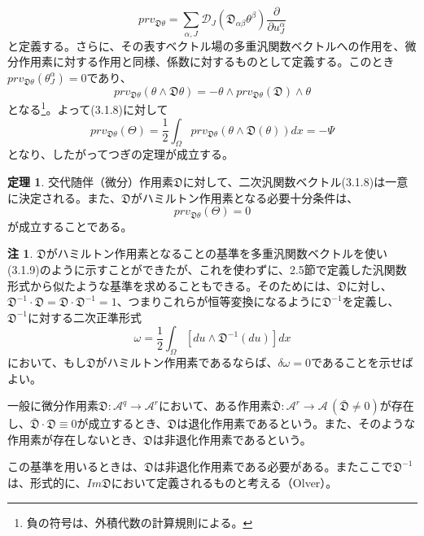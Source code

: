 \documentclass[a4paper, 11pt]{report}
\theoremstyle{definition}
\newtheorem{theorem}{定理}[section]
\newtheorem*{remark*}{注}
\begin{document}
\begin{equation*}
prv_{\mathfrak{D}\theta} = \sum_{\alpha ,J}\mathcal{D}_J(\mathfrak{D}_{\alpha\beta}\theta^\beta )\frac{\partial}{\partial u_J^\alpha }
\end{equation*}
と定義する。さらに、その表すベクトル場の多重汎関数ベクトルへの作用を、微分作用素に対する作用と同様、係数に対するものとして定義する。このとき$prv_{\mathfrak{D}\theta}(\theta_J^\alpha )=0$であり、
\begin{equation*}
prv_{\mathfrak{D}\theta}(\theta\wedge\mathfrak{D}\theta ) = -\theta\wedge prv_{\mathfrak{D}\theta}(\mathfrak{D})\wedge\theta
\end{equation*}
となる\footnote{負の符号は、外積代数の計算規則による。}。よって(3.1.8)に対して
\begin{equation*}
prv_{\mathfrak{D}\theta}(\Theta ) = \frac{1}{2}\int_\Omega prv_{\mathfrak{D}\theta}(\theta\wedge\mathfrak{D}(\theta ))dx = -\Psi
\end{equation*}
となり、したがってつぎの定理が成立する。

\begin{theorem}
 交代随伴（微分）作用素$\mathfrak{D}$に対して、二次汎関数ベクトル(3.1.8)は一意に決定される。また、$\mathfrak{D}$がハミルトン作用素となる必要十分条件は、
\begin{equation}
prv_{\mathfrak{D}\theta}(\Theta ) = 0  %
\end{equation}
が成立することである。
\end{theorem}

\begin{remark*}
 $\mathfrak{D}$がハミルトン作用素となることの基準を多重汎関数ベクトルを使い(3.1.9)のように示すことができたが、これを使わずに、2.5節で定義した汎関数形式から似たような基準を求めることもできる。そのためには、$\mathfrak{D}$に対し、$\mathfrak{D}^{-1}\cdot\mathfrak{D}=\mathfrak{D}\cdot\mathfrak{D}^{-1}=1$、つまりこれらが恒等変換になるように$\mathfrak{D}^{-1}$を定義し、$\mathfrak{D}^{-1}$に対する二次正準形式
\begin{equation*}
\omega = \frac{1}{2}\int_\Omega [du\wedge \mathfrak{D}^{-1}(du)]dx
\end{equation*}
において、もし$\mathfrak{D}$がハミルトン作用素であるならば、$\delta\omega =0$であることを示せばよい。

 一般に微分作用素$\mathfrak{D}:\mathcal{A}^q\longrightarrow\mathcal{A}^r$において、ある作用素$\bar{\mathfrak{D}}:\mathcal{A}^r\longrightarrow\mathcal{A}\, (\bar{\mathfrak{D}}\ne 0)$が存在し、$\bar{\mathfrak{D}}\cdot\mathfrak{D}\equiv 0$が成立するとき、$\mathfrak{D}$は退化作用素であるという。また、そのような作用素が存在しないとき、$\mathfrak{D}$は非退化作用素であるという。

 この基準を用いるときは、$\mathfrak{D}$は非退化作用素である必要がある。またここで$\mathfrak{D}^{-1}$は、形式的に、$Im\mathfrak{D}$において定義されるものと考える（Olver\cite{Olver2}）。
\end{remark*}
\end{document}
